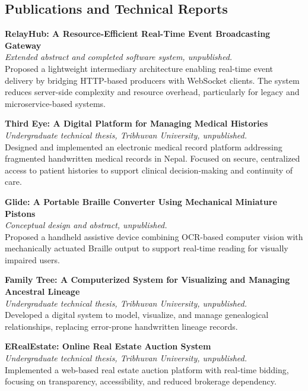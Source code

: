 \hypertarget{publications-and-technical-reports}{%
\subsection{\texorpdfstring{\textbf{Publications and Technical
Reports}}{Publications and Technical Reports}}\label{publications-and-technical-reports}}

\textbf{RelayHub: A Resource-Efficient Real-Time Event Broadcasting
Gateway}\\
\emph{Extended abstract and completed software system, unpublished.}\\
Proposed a lightweight intermediary architecture enabling real-time
event delivery by bridging HTTP-based producers with WebSocket clients.
The system reduces server-side complexity and resource overhead,
particularly for legacy and microservice-based systems.

\textbf{Third Eye: A Digital Platform for Managing Medical Histories}\\
\emph{Undergraduate technical thesis, Tribhuvan University,
unpublished.}\\
Designed and implemented an electronic medical record platform
addressing fragmented handwritten medical records in Nepal. Focused on
secure, centralized access to patient histories to support clinical
decision-making and continuity of care.

\textbf{Glide: A Portable Braille Converter Using Mechanical Miniature
Pistons}\\
\emph{Conceptual design and abstract, unpublished.}\\
Proposed a handheld assistive device combining OCR-based computer vision
with mechanically actuated Braille output to support real-time reading
for visually impaired users.

\textbf{Family Tree: A Computerized System for Visualizing and Managing
Ancestral Lineage}\\
\emph{Undergraduate technical thesis, Tribhuvan University,
unpublished.}\\
Developed a digital system to model, visualize, and manage genealogical
relationships, replacing error-prone handwritten lineage records.

\textbf{ERealEstate: Online Real Estate Auction System}\\
\emph{Undergraduate technical thesis, Tribhuvan University,
unpublished.}\\
Implemented a web-based real estate auction platform with real-time
bidding, focusing on transparency, accessibility, and reduced brokerage
dependency.

